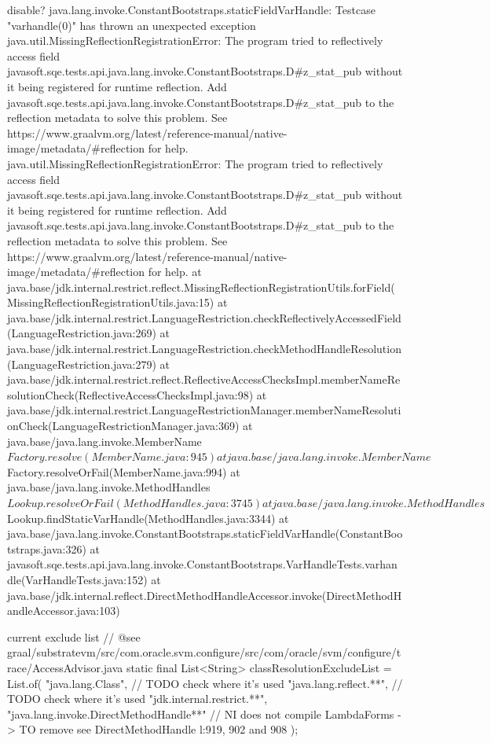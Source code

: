 disable?
java.lang.invoke.ConstantBootstraps.staticFieldVarHandle:
Testcase "varhandle(0)" has thrown an unexpected exception java.util.MissingReflectionRegistrationError: The program tried to reflectively access field javasoft.sqe.tests.api.java.lang.invoke.ConstantBootstraps.D#z_stat_pub without it being registered for runtime reflection. Add javasoft.sqe.tests.api.java.lang.invoke.ConstantBootstraps.D#z_stat_pub to the reflection metadata to solve this problem. See https://www.graalvm.org/latest/reference-manual/native-image/metadata/#reflection for help.
java.util.MissingReflectionRegistrationError: The program tried to reflectively access field javasoft.sqe.tests.api.java.lang.invoke.ConstantBootstraps.D#z_stat_pub without it being registered for runtime reflection. Add javasoft.sqe.tests.api.java.lang.invoke.ConstantBootstraps.D#z_stat_pub to the reflection metadata to solve this problem. See https://www.graalvm.org/latest/reference-manual/native-image/metadata/#reflection for help.
        at java.base/jdk.internal.restrict.reflect.MissingReflectionRegistrationUtils.forField(MissingReflectionRegistrationUtils.java:15)
        at java.base/jdk.internal.restrict.LanguageRestriction.checkReflectivelyAccessedField(LanguageRestriction.java:269)
        at java.base/jdk.internal.restrict.LanguageRestriction.checkMethodHandleResolution(LanguageRestriction.java:279)
        at java.base/jdk.internal.restrict.reflect.ReflectiveAccessChecksImpl.memberNameResolutionCheck(ReflectiveAccessChecksImpl.java:98)
        at java.base/jdk.internal.restrict.LanguageRestrictionManager.memberNameResolutionCheck(LanguageRestrictionManager.java:369)
        at java.base/java.lang.invoke.MemberName$Factory.resolve(MemberName.java:945)
        at java.base/java.lang.invoke.MemberName$Factory.resolveOrFail(MemberName.java:994)
        at java.base/java.lang.invoke.MethodHandles$Lookup.resolveOrFail(MethodHandles.java:3745)
        at java.base/java.lang.invoke.MethodHandles$Lookup.findStaticVarHandle(MethodHandles.java:3344)
        at java.base/java.lang.invoke.ConstantBootstraps.staticFieldVarHandle(ConstantBootstraps.java:326)
        at javasoft.sqe.tests.api.java.lang.invoke.ConstantBootstraps.VarHandleTests.varhandle(VarHandleTests.java:152)
        at java.base/jdk.internal.reflect.DirectMethodHandleAccessor.invoke(DirectMethodHandleAccessor.java:103)



current exclude list
        // @see graal/substratevm/src/com.oracle.svm.configure/src/com/oracle/svm/configure/trace/AccessAdvisor.java
    static final List<String> classResolutionExcludeList = List.of(
            "java.lang.Class", // TODO check where it's used
            "java.lang.reflect.**", // TODO check where it's used
            "jdk.internal.restrict.**",
            "java.lang.invoke.DirectMethodHandle**" // NI does not compile LambdaForms -> TO remove see DirectMethodHandle l:919, 902 and 908
    );

